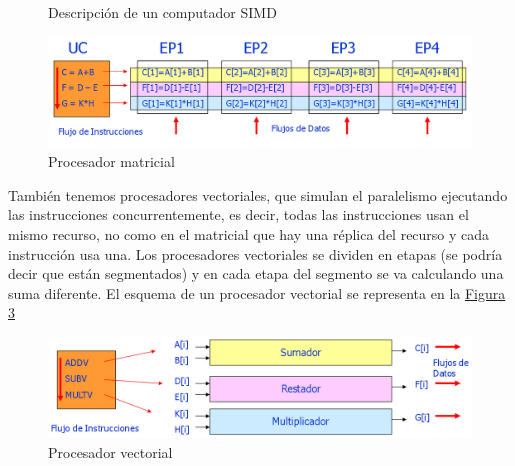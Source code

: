 \documentclass[10pt,a4paper,spanish]{report}
\begin{document}
\begin{figure}[!h]
\centering
\mbox {
\qquad
{}
}
\caption{Descripción de un computador SIMD}
\label{simd}
\end{figure}

\begin{figure}[!h]
\centering
\includegraphics[width=1\textwidth]{19}
\caption{Procesador matricial}
\label{procesador_matricial}
\end{figure}

También tenemos procesadores vectoriales, que simulan el paralelismo ejecutando las instrucciones concurrentemente, es decir, todas las instrucciones usan el mismo recurso, no como en el matricial que hay una réplica del recurso y cada instrucción usa una. Los procesadores vectoriales se dividen en etapas (se podría decir que están segmentados) y en cada etapa del segmento se va calculando una suma diferente. El esquema de un procesador vectorial se representa en la \hyperref[procesador_vectorial]{Figura \ref*{procesador_vectorial}}

\begin{figure}[!h]
\centering
\includegraphics[width=1\textwidth]{21}
\caption{Procesador vectorial}
\label{procesador_vectorial}
\end{figure}
\end{document}
